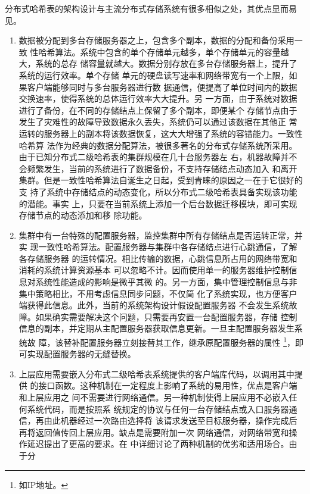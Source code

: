 分布式哈希表的架构设计与主流分布式存储系统有很多相似之处，其优点显而易见。
\begin{enumerate}
  \item 数据被分配到多台存储服务器之上，包含多个副本，数据的分配和备份采用一致
  性哈希算法。系统中包含的单个存储单元越多，单个存储单元的容量越大，系统的总存
  储容量就越大。数据分别存放在多台存储服务器上，提升了系统的运行效率。单个存储
  单元的硬盘读写速率和网络带宽有一个上限，如果客户端能够同时与多台服务器进行数
  据通信，便提高了单位时间内的数据交换速率，使得系统的总体运行效率大大提升。另
  一方面，由于系统对数据进行了备份，在不同的存储结点上保留了多个副本，即便某个
  存储节点由于发生了灾难性的故障导致数据永久丢失，系统仍可以通过该数据在其他正
  常运转的服务器上的副本将该数据恢复，这大大增强了系统的容错能力。一致性哈希算
  法作为经典的数据分配算法，被很多著名的分布式存储系统所采用。
  \cite{hastorun2007dynamo}由于已知分布式二级哈希表的集群规模在几十台服务器左
  右，机器故障并不会频繁发生，当前的系统进行了数据备份，不支持存储结点动态加入
  和离开集群。但是一致性哈希算法自诞生之日起，受到青睐的原因之一在于它很好的支
  持了系统中存储结点的动态变化，所以分布式二级哈希表具备实现该功能的潜能。事实
  上，只要在当前系统上添加一个后台数据迁移模块，即可实现存储节点的动态添加和移
  除功能。
  \item 集群中有一台特殊的配置服务器，监控集群中所有存储结点是否运转正常，并实
  现一致性哈希算法。配置服务器与集群中各存储结点进行心跳通信，了解各存储服务器
  的运转情况。相比传输的数据，心跳信息所占用的网络带宽和消耗的系统计算资源基本
  可以忽略不计。因而使用单一的服务器维护控制信息对系统性能造成的影响是微乎其微
  的。另一方面，集中管理控制信息与非集中策略相比，不用考虑信息同步问题，不仅简
  化了系统实现，也方便客户端获得此信息。此外，当前的系统架构设计假设配置服务器
  不会发生系统故障。如果确实需要解决这个问题，只需要再安置一台配置服务器，存储
  控制信息的副本，并定期从主配置服务器获取信息更新。一旦主配置服务器发生系统故
  障，该替补配置服务器立刻接替其工作，继承原配置服务器的属性
  \footnote{如IP地址。}，即可实现配置服务器的无缝替换。
  \item 上层应用需要嵌入分布式二级哈希表系统提供的客户端库代码，以调用其中提供
  的接口函数。这种机制在一定程度上影响了系统的易用性，优点是客户端和上层应用之
  间不需要进行网络通信。另一种机制使得上层应用不必嵌入任何系统代码，而是按照系
  统规定的协议与任何一台存储结点或入口服务器通信，再由此机器经过一次路由选择将
  该请求发送至目标服务器，操作完成后再将返回值传回上层应用。缺点是需要附加一次
  网络通信，对网络带宽和操作延迟提出了更高的要求。在
  中详细讨论了两种机制的优劣和适用场合。由于分

\end{enumerate}
